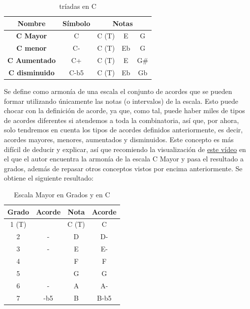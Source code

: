 \begin{table}[h]
    \centering
    \begin{tabular}{c|c|c|c|c}       
        \textbf{Nombre} & \textbf{Símbolo} & \multicolumn{3}{c}{\textbf{Notas}} \\
        \hline
        \hline
        \textbf{C Mayor} & C & C (T) & E & G \\
        \hline
        \textbf{C menor} & C- & C (T) & Eb & G \\
        \hline
        \textbf{C Aumentado} & C+ & C (T) & E & G\# \\
        \hline
        \textbf{C disminuido} & C-b5 & C (T) & Eb & Gb \\
    \end{tabular}
    \caption{tríadas en C}
    \label{tab:triadsC}
\end{table}

    \label{arm:armonia_escala}
    Se define como armonía de una escala el conjunto de acordes que se pueden formar utilizando únicamente las notas (o intervalos) de la escala. Esto puede chocar con la definición de acorde, ya que, como tal, puede haber miles de tipos de acordes diferentes si atendemos a toda la combinatoria, así que, por ahora, solo tendremos en cuenta los tipos de acordes definidos anteriormente, es decir, acordes mayores, menores, aumentados y disminuidos. Este concepto es más difícil de deducir y explicar, así que recomiendo la visualización de \href{https://www.youtube.com/watch?v=dMwVB3BWcjI}{este vídeo} en el que el autor encuentra la armonía de la escala C Mayor y pasa el resultado a grados, además de repasar otros conceptos vistos por encima anteriormente. Se obtiene el siguiente resultado:

\begin{table}[h]
    \centering
    \begin{tabular}{c|c||c|c}
        \textbf{Grado} & \textbf{Acorde} & \textbf{Nota} & \textbf{Acorde} \\
        \hline
        1 (T) &  & C (T) & C \\
        2 & - & D & D- \\
        3 & - & E & E- \\
        4 &  & F & F \\
        5 &  & G & G \\
        6 & - & A & A- \\
        7 & -b5 & B & B-b5 \\
    \end{tabular}
    \caption{Escala Mayor en Grados y en C}
    \label{tab:grados_C}
\end{table}


